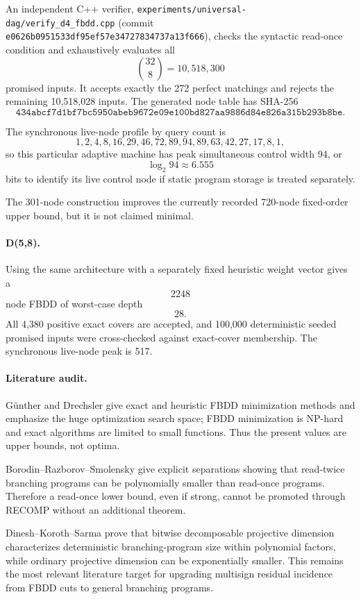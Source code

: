 An independent C++ verifier,
\texttt{experiments/universal-dag/verify\_d4\_fbdd.cpp}
(commit \texttt{e0626b0951533df95ef57e34727834737a13f666}),
checks the syntactic read-once condition and exhaustively evaluates all
\[
\binom{32}{8}=10{,}518{,}300
\]
promised inputs. It accepts exactly the 272 perfect matchings and rejects the remaining 10,518,028 inputs. The generated node table has SHA-256
\[
\texttt{434abcf7d1bf7bc5950abeb9672e09e100bd827aa9886d84e826a315b293b8be}.
\]

The synchronous live-node profile by query count is
\[
1,2,4,8,16,29,46,72,89,94,89,63,42,27,17,8,1,
\]
so this particular adaptive machine has peak simultaneous control width 94, or
\[
\log_2 94\approx6.555
\]
bits to identify its live control node if static program storage is treated separately.

The 301-node construction improves the currently recorded 720-node fixed-order upper bound, but it is not claimed minimal.

\paragraph{D(5,8).}
Using the same architecture with a separately fixed heuristic weight vector gives a
\[
\boxed{2248}
\]
node FBDD of worst-case depth
\[
\boxed{28}.
\]
All 4,380 positive exact covers are accepted, and 100,000 deterministic seeded promised inputs were cross-checked against exact-cover membership. The synchronous live-node peak is 517.

\paragraph{Literature audit.}
G\"unther and Drechsler give exact and heuristic FBDD minimization methods and emphasize the huge optimization search space; FBDD minimization is NP-hard and exact algorithms are limited to small functions. Thus the present values are upper bounds, not optima.

Borodin--Razborov--Smolensky give explicit separations showing that read-twice branching programs can be polynomially smaller than read-once programs. Therefore a read-once lower bound, even if strong, cannot be promoted through RECOMP without an additional theorem.

Dinesh--Koroth--Sarma prove that bitwise decomposable projective dimension characterizes deterministic branching-program size within polynomial factors, while ordinary projective dimension can be exponentially smaller. This remains the most relevant literature target for upgrading multisign residual incidence from FBDD cuts to general branching programs.

